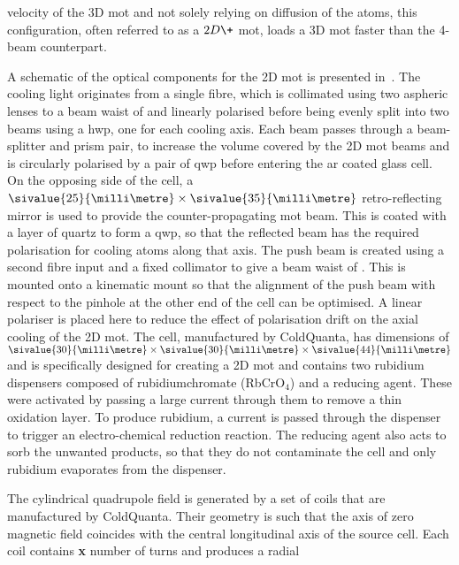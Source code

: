 velocity of the 3D \ac{mot} and not solely relying on diffusion of the atoms,
this configuration, often referred to as a \(2D\+\) \ac{mot}, loads a 3D
\ac{mot} faster than the 4-beam counterpart. \par\noindent 
A schematic of the optical components for the 2D \ac{mot} is presented
in~. The cooling light originates from a single fibre,
which is collimated using two aspheric lenses to a beam waist of
 and linearly polarised before being evenly split
into two beams using a \ac{hwp}, one for each cooling axis. Each beam passes
through a beam-splitter and prism pair, to increase the volume covered by the
2D \ac{mot} beams and is circularly polarised by a pair of \ac{qwp} before
entering the \ac{ar} coated glass cell. On the opposing side of the cell, a
\(\sivalue{25}{\milli\metre} \times \sivalue{35}{\milli\metre}\)
retro-reflecting mirror is used to provide the counter-propagating \ac{mot}
beam. This is coated with a layer of quartz to form a \ac{qwp}, so that the
reflected beam has the required polarisation for cooling atoms along that
axis. The push beam is created using a second fibre input and a fixed
collimator to give a beam waist of . This is
mounted onto a  kinematic mount so that the alignment of
the push beam with respect to the  pinhole at the
other end of the cell can be optimised. A linear polariser is placed here to
reduce the effect of polarisation drift on the axial cooling of the 2D
\ac{mot}. The cell, manufactured by ColdQuanta, has dimensions of
\(\sivalue{30}{\milli\metre} \times \sivalue{30}{\milli\metre} \times
\sivalue{44}{\milli\metre}\) and is specifically designed for creating a 2D\+
\ac{mot} and contains two rubidium dispensers composed of rubidiumchromate
(RbCrO\(_4\)) and a reducing agent. These were activated by passing a large
current through them to remove a thin oxidation layer. To produce rubidium, a
current is passed through the dispenser to trigger an electro-chemical
reduction reaction. The reducing agent also acts to sorb the unwanted
products, so that they do not contaminate the cell and only rubidium
evaporates from the dispenser. \par\noindent
The cylindrical quadrupole field is generated by a set of coils that are
manufactured by ColdQuanta. Their geometry is such that the axis of zero
magnetic field coincides with the central longitudinal axis of the source
cell. Each coil contains {\textbf {x}} number of turns and produces a radial
